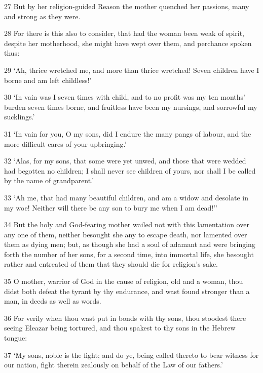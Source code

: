 \par 27 But by her religion-guided Reason the mother quenched her passions, many and strong as they were.

\par 28 For there is this also to consider, that had the woman been weak of spirit, despite her motherhood, she might have wept over them, and perchance spoken thus:

\par 29 ‘Ah, thrice wretched me, and more than thrice wretched! Seven children have I borne and am left childless!’

\par 30 ‘In vain was I seven times with child, and to no profit was my ten months' burden seven times borne, and fruitless have been my nursings, and sorrowful my sucklings.’

\par 31 ‘In vain for you, O my sons, did I endure the many pangs of labour, and the more difficult cares of your upbringing.’

\par 32 ‘Alas, for my sons, that some were yet unwed, and those that were wedded had begotten no children; I shall never see children of yours, nor shall I be called by the name of grandparent.’

\par 33 ‘Ah me, that had many beautiful children, and am a widow and desolate in my woe! Neither will there be any son to bury me when I am dead!’'

\par 34 But the holy and God-fearing mother wailed not with this lamentation over any one of them, neither besought she any to escape death, nor lamented over them as dying men; but, as though she had a soul of adamant and were bringing forth the number of her sons, for a second time, into immortal life, she besought rather and entreated of them that they should die for religion's sake.

\par 35 O mother, warrior of God in the cause of religion, old and a woman, thou didst both defeat the tyrant by thy endurance, and wast found stronger than a man, in deeds as well as words.

\par 36 For verily when thou wast put in bonds with thy sons, thou stoodest there seeing Eleazar being tortured, and thou spakest to thy sons in the Hebrew tongue:

\par 37 ‘My sons, noble is the fight; and do ye, being called thereto to bear witness for our nation, fight therein zealously on behalf of the Law of our fathers.’


